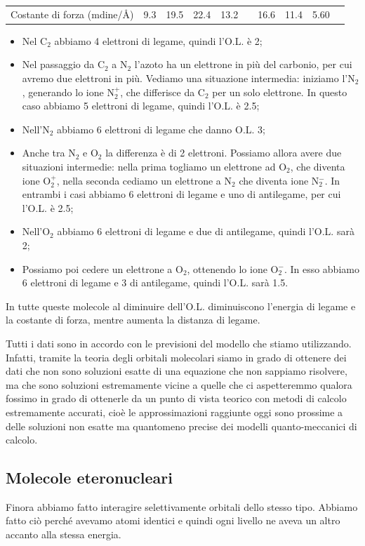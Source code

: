 \begin{center}
\begin{tabular}{ m{3cm}m{1cm}m{1cm}m{1cm}m{1cm}|m{1cm}m{1cm}m{1cm}m{1cm}m{1cm}}
        \vspace{0.2cm}Costante di forza (mdine/Å) & 9.3 & 19.5 & 22.4 & 13.2 & & 16.6 & 11.4 & 5.60
    \end{tabular}
\end{center}

\begin{itemize}
    \item Nel C$_2$ abbiamo 4 elettroni di legame, quindi l'O.L. è 2;
    \item Nel passaggio da C$_2$ a N$_2$ l'azoto ha un elettrone in più del carbonio, per cui avremo due elettroni in più. Vediamo una situazione intermedia: iniziamo l'N$_2$, generando lo ione N$_2^+$, che differisce da C$_2$ per un solo elettrone. In questo caso abbiamo 5 elettroni di legame, quindi l'O.L. è 2.5;
    \item Nell'N$_2$ abbiamo 6 elettroni di legame che danno O.L. 3;
    \item Anche tra N$_2$ e O$_2$ la differenza è di 2 elettroni. Possiamo allora avere due situazioni intermedie: nella prima togliamo un elettrone ad O$_2$, che diventa ione O$_2^+$, nella seconda cediamo un elettrone a N$_2$ che diventa ione N$_2^-$. In entrambi i casi abbiamo 6 elettroni di legame e uno di antilegame, per cui l'O.L. è 2.5;
    \item Nell'O$_2$ abbiamo 6 elettroni di legame e due di antilegame, quindi l'O.L. sarà 2;
    \item Possiamo poi cedere un elettrone a O$_2$, ottenendo lo ione O$_2^-$. In esso abbiamo 6 elettroni di legame e 3 di antilegame, quindi l'O.L. sarà 1.5.
\end{itemize}

In tutte queste molecole al diminuire dell'O.L. diminuiscono l'energia di legame e la costante di forza, mentre aumenta la distanza di legame.

Tutti i dati sono in accordo con le previsioni del modello che stiamo utilizzando. Infatti, tramite la teoria degli orbitali molecolari siamo in grado di ottenere dei dati che non sono soluzioni esatte di una equazione che non sappiamo risolvere, ma che sono soluzioni estremamente vicine a quelle che ci aspetteremmo qualora fossimo in grado di ottenerle da un punto di vista teorico con metodi di calcolo estremamente accurati, cioè le approssimazioni raggiunte oggi sono prossime a delle soluzioni non esatte ma quantomeno precise dei modelli quanto-meccanici di calcolo.

\subsection{Molecole eteronucleari}
Finora abbiamo fatto interagire selettivamente orbitali dello stesso tipo. Abbiamo fatto ciò perché avevamo atomi identici e quindi ogni livello ne aveva un altro accanto alla stessa energia.

